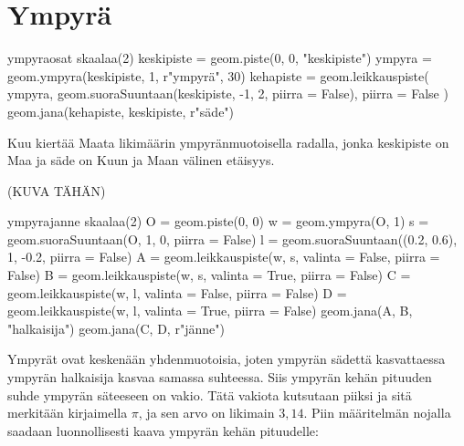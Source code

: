 \section*{Ympyrä}

\begin{luoKuva}{ympyraosat}
	skaalaa(2)
	keskipiste = geom.piste(0, 0, "keskipiste")
	ympyra = geom.ympyra(keskipiste, 1, r"ympyr\"{a}", 30)
	kehapiste = geom.leikkauspiste(
		ympyra, geom.suoraSuuntaan(keskipiste, -1, 2, piirra = False), piirra = False
	)
	geom.jana(kehapiste, keskipiste, r"s\"{a}de")
\end{luoKuva}
\begin{center}
\end{center}

\begin{esimerkki}
Kuu kiertää Maata likimäärin ympyränmuotoisella radalla, jonka keskipiste on Maa ja säde on Kuun ja Maan välinen etäisyys.
\end{esimerkki}

(KUVA TÄHÄN)

\begin{luoKuva}{ympyrajanne}
	skaalaa(2)
	O = geom.piste(0, 0)
	w = geom.ympyra(O, 1)
	s = geom.suoraSuuntaan(O, 1, 0, piirra = False)
	l = geom.suoraSuuntaan((0.2, 0.6), 1, -0.2, piirra = False)
	A = geom.leikkauspiste(w, s, valinta = False, piirra = False)
	B = geom.leikkauspiste(w, s, valinta = True, piirra = False)
	C = geom.leikkauspiste(w, l, valinta = False, piirra = False)
	D = geom.leikkauspiste(w, l, valinta = True, piirra = False)
	geom.jana(A, B, "halkaisija")
	geom.jana(C, D, r"j\"{a}nne")
\end{luoKuva}
\begin{center}
\end{center}

Ympyrät ovat keskenään yhdenmuotoisia, joten ympyrän sädettä kasvattaessa ympyrän halkaisija kasvaa samassa suhteessa. Siis ympyrän kehän pituuden suhde ympyrän säteeseen on vakio. Tätä vakiota kutsutaan piiksi ja sitä merkitään kirjaimella $\pi$, ja sen arvo on likimain $3,14$. Piin määritelmän nojalla saadaan luonnollisesti kaava ympyrän kehän pituudelle:

